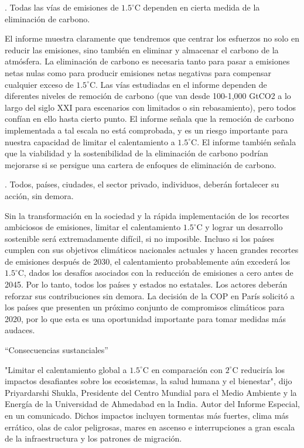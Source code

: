 \documentclass[12pt,a4paper]{article}
\begin{document}
. Todas las vías de emisiones de $1.5^{\circ} $C dependen en cierta medida de la eliminación de carbono.

\noindent El informe muestra claramente que tendremos que centrar los esfuerzos no solo en reducir las emisiones, sino también en eliminar y almacenar el carbono de la atmósfera. La eliminación de carbono es necesaria tanto para pasar a emisiones netas nulas como para producir emisiones netas negativas para compensar cualquier exceso de $1.5^{\circ} $C. Las vías estudiadas en el informe dependen de diferentes niveles de remoción de carbono (que van desde 100-1,000 GtCO2 a lo largo del siglo XXI para escenarios con limitados o sin rebasamiento), pero todos confían en ello hasta cierto punto. El informe señala que la remoción de carbono implementada a tal escala no está comprobada, y es un riesgo importante para nuestra capacidad de limitar el calentamiento a $1.5^{\circ} $C. El informe también señala que la viabilidad y la sostenibilidad de la eliminación de carbono podrían mejorarse si se persigue una cartera de enfoques de eliminación de carbono.

. Todos, países, ciudades, el sector privado, individuos, deberán fortalecer su acción, sin demora.

\noindent Sin la transformación en la sociedad y la rápida implementación de los recortes ambiciosos de emisiones, limitar el calentamiento $1.5^{\circ} $C y lograr un desarrollo sostenible será extremadamente difícil, si no imposible. Incluso si los países cumplen con sus objetivos climáticos nacionales actuales y hacen grandes recortes de emisiones después de 2030, el calentamiento probablemente aún excederá los $1.5^{\circ} $C, dados los desafíos asociados con la reducción de emisiones a cero antes de 2045. Por lo tanto, todos los países y estados no estatales. Los actores deberán reforzar sus contribuciones sin demora. La decisión de la COP en París solicitó a los países que presenten un próximo conjunto de compromisos climáticos para 2020, por lo que esta es una oportunidad importante para tomar medidas más audaces. 

\noindent “Consecuencias sustanciales”

\noindent "Limitar el calentamiento global a $1.5^{\circ} $C en comparación con $2^{\circ} $C reduciría los impactos desafiantes sobre los ecosistemas, la salud humana y el bienestar", dijo Priyardarshi Shukla, Presidente del Centro Mundial para el Medio Ambiente y la Energía de la Universidad de Ahmedabad en la India. Autor del Informe Especial, en un comunicado. Dichos impactos incluyen tormentas más fuertes, clima más errático, olas de calor peligrosas, mares en ascenso e interrupciones a gran escala de la infraestructura y los patrones de migración.
\end{document}
